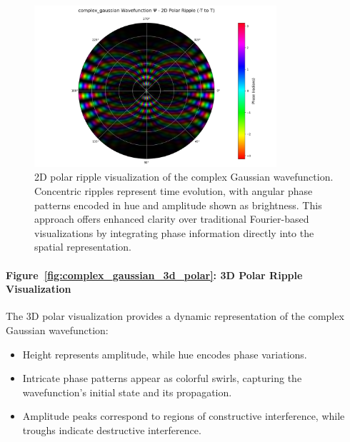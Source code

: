 \documentclass[12pt]{article}
\begin{document}
\begin{figure}[H]
\centering
\includegraphics[width=0.8\textwidth]{images/complex_gaussian_wavefunction_2d_polar_probability_density_with_phase.png}
\caption{2D polar ripple visualization of the complex Gaussian wavefunction. Concentric ripples represent time evolution, with angular phase patterns encoded in hue and amplitude shown as brightness. This approach offers enhanced clarity over traditional Fourier-based visualizations by integrating phase information directly into the spatial representation.}
\label{fig:complex_gaussian_2d_polar}
\end{figure}

\paragraph{Figure~\ref{fig:complex_gaussian_3d_polar}: 3D Polar Ripple Visualization}
The 3D polar visualization provides a dynamic representation of the complex Gaussian wavefunction:
\begin{itemize}
    \item Height represents amplitude, while hue encodes phase variations.
    \item Intricate phase patterns appear as colorful swirls, capturing the wavefunction’s initial state and its propagation.
    \item Amplitude peaks correspond to regions of constructive interference, while troughs indicate destructive interference.
\end{itemize}
\end{document}
